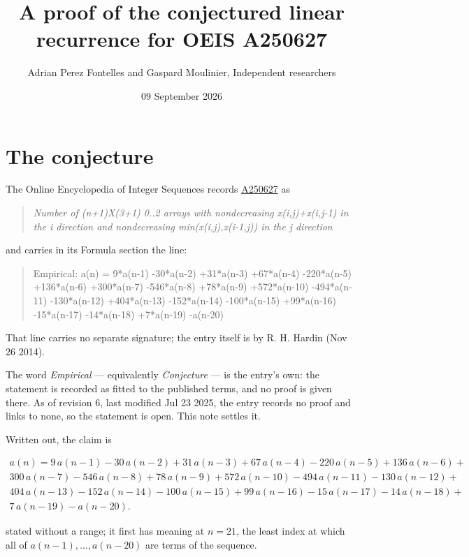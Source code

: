 \documentclass[11pt]{article}
\title{A proof of the conjectured linear recurrence for OEIS A250627}
\author{Adrian Perez Fontelles and Gaspard Moulinier, Independent researchers}
\date{09 September 2026}
\theoremstyle{definition}
\begin{document}
\maketitle
\section{The conjecture}

The Online Encyclopedia of Integer Sequences records \href{https://oeis.org/A250627}{A250627} as

\begin{quote}\itshape Number of (n+1)X(3+1) 0..2 arrays with nondecreasing x(i,j)+x(i,j-1) in the i direction and nondecreasing min(x(i,j),x(i-1,j)) in the j direction\end{quote}

and carries in its Formula section the line:

\begin{quote}\ttfamily Empirical: a(n) = 9*a(n-1) -30*a(n-2) +31*a(n-3) +67*a(n-4) -220*a(n-5) +136*a(n-6) +300*a(n-7) -546*a(n-8) +78*a(n-9) +572*a(n-10) -494*a(n-11) -130*a(n-12) +404*a(n-13) -152*a(n-14) -100*a(n-15) +99*a(n-16) -15*a(n-17) -14*a(n-18) +7*a(n-19) -a(n-20)\end{quote}

That line carries no separate signature; the entry itself is by R. H. Hardin (Nov 26 2014).

The word {\itshape Empirical} --- equivalently {\itshape Conjecture} --- is the entry's own: the statement is recorded as fitted to the published terms, and no proof is given there. As of revision 6, last modified Jul 23 2025, the entry records no proof and links to none, so the statement is open. This note settles it.

Written out, the claim is

\begin{multline*} a(n) = 9\,a(n-1) - 30\,a(n-2) + 31\,a(n-3) + 67\,a(n-4) - 220\,a(n-5) + 136\,a(n-6) + \\ 300\,a(n-7) - 546\,a(n-8) + 78\,a(n-9) + 572\,a(n-10) - 494\,a(n-11) - 130\,a(n-12) + \\ 404\,a(n-13) - 152\,a(n-14) - 100\,a(n-15) + 99\,a(n-16) - 15\,a(n-17) - 14\,a(n-18) + \\ 7\,a(n-19) - a(n-20). \end{multline*}

stated without a range; it first has meaning at $n = 21$, the least index at which all of $a(n-1),\dots,a(n-20)$ are terms of the sequence.
\end{document}
